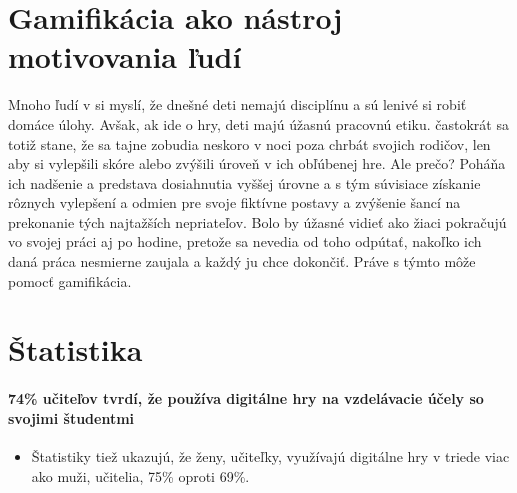 \documentclass[10pt,twoside,slovak,a4paper]{article}
\begin{document}
\section{Gamifikácia ako nástroj motivovania ľudí}
Mnoho ľudí v si myslí, že dnešné deti nemajú disciplínu a sú lenivé si robiť domáce úlohy. Avšak, ak ide o hry, deti majú úžasnú pracovnú etiku. častokrát sa totiž stane, že sa tajne zobudia neskoro v noci poza chrbát svojich rodičov, len aby si vylepšili skóre alebo zvýšili úroveň v ich obľúbenej hre. Ale prečo? Poháňa ich nadšenie a predstava dosiahnutia vyššej úrovne a s tým súvisiace získanie rôznych vylepšení a odmien pre svoje fiktívne postavy a zvýšenie šancí na prekonanie tých najtažších nepriateľov. Bolo by úžasné vidieť ako žiaci pokračujú vo svojej práci aj po hodine, pretože sa nevedia od toho odpútať, nakoľko ich daná práca nesmierne zaujala a každý ju chce dokončiť. Práve s týmto môže pomocť gamifikácia.

\section{Štatistika}
\cite{soo}
\begin{table}[ht!]
    \centering
\end{table}
\paragraph{74\% učiteľov tvrdí, že používa digitálne hry na vzdelávacie účely so svojimi študentmi\cite{academic}}\label{74}
    \begin{itemize}
        \item Štatistiky tiež ukazujú, že ženy, učiteľky, využívajú digitálne hry v triede viac ako muži, učitelia, 75\% oproti 69\%.
    \end{itemize}
    
\end{document}
